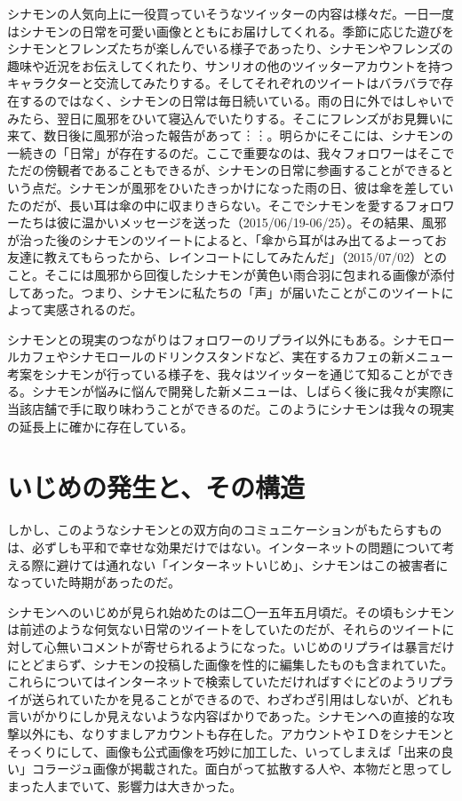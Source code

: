 \documentclass[b5j,twoside,twocolumn]{utarticle}
\begin{document}
シナモンの人気向上に一役買っていそうなツイッターの内容は様々だ。一日一度はシナモンの日常を可愛い画像とともにお届けしてくれる。季節に応じた遊びをシナモンとフレンズたちが楽しんでいる様子であったり、シナモンやフレンズの趣味や近況をお伝えしてくれたり、サンリオの他のツイッターアカウントを持つキャラクターと交流してみたりする。そしてそれぞれのツイートはバラバラで存在するのではなく、シナモンの日常は毎日続いている。雨の日に外ではしゃいでみたら、翌日に風邪をひいて寝込んでいたりする。そこにフレンズがお見舞いに来て、数日後に風邪が治った報告があって︙︙。明らかにそこには、シナモンの一続きの「日常」が存在するのだ。ここで重要なのは、我々フォロワーはそこでただの傍観者であることもできるが、シナモンの日常に参画することができるという点だ。シナモンが風邪をひいたきっかけになった雨の日、彼は傘を差していたのだが、長い耳は傘の中に収まりきらない。そこでシナモンを愛するフォロワーたちは彼に温かいメッセージを送った（2015/06/19-06/25）。その結果、風邪が治った後のシナモンのツイートによると、「傘から耳がはみ出てるよーってお友達に教えてもらったから、レインコートにしてみたんだ」（2015/07/02）とのこと。そこには風邪から回復したシナモンが黄色い雨合羽に包まれる画像が添付してあった。つまり、シナモンに私たちの「声」が届いたことがこのツイートによって実感されるのだ。


シナモンとの現実のつながりはフォロワーのリプライ以外にもある。シナモロールカフェやシナモロールのドリンクスタンドなど、実在するカフェの新メニュー考案をシナモンが行っている様子を、我々はツイッターを通じて知ることができる。シナモンが悩みに悩んで開発した新メニューは、しばらく後に我々が実際に当該店舗で手に取り味わうことができるのだ。このようにシナモンは我々の現実の延長上に確かに存在している。

\section*{いじめの発生と、その構造}
しかし、このようなシナモンとの双方向のコミュニケーションがもたらすものは、必ずしも平和で幸せな効果だけではない。インターネットの問題について考える際に避けては通れない「インターネットいじめ」、シナモンはこの被害者になっていた時期があったのだ。


シナモンへのいじめが見られ始めたのは二〇一五年五月頃だ。その頃もシナモンは前述のような何気ない日常のツイートをしていたのだが、それらのツイートに対して心無いコメントが寄せられるようになった。いじめのリプライは暴言だけにとどまらず、シナモンの投稿した画像を性的に編集したものも含まれていた。これらについてはインターネットで検索していただければすぐにどのようリプライが送られていたかを見ることができるので、わざわざ引用はしないが、どれも言いがかりにしか見えないような内容ばかりであった。シナモンへの直接的な攻撃以外にも、なりすましアカウントも存在した。アカウントやＩＤをシナモンとそっくりにして、画像も公式画像を巧妙に加工した、いってしまえば「出来の良い」コラージュ画像が掲載された。面白がって拡散する人や、本物だと思ってしまった人までいて、影響力は大きかった。
\end{document}
